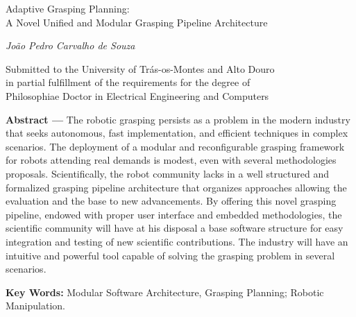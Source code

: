 
\begin{center}
\large{Adaptive Grasping Planning: \\A Novel Unified and Modular Grasping Pipeline Architecture}

\vskip5mm
\normalsize{\textit{João Pedro Carvalho de Souza}}

\vskip5mm
\small{Submitted to the University of Trás-os-Montes and Alto Douro \\
in partial fulfillment of the requirements for the degree of \\
Philosophiae Doctor in Electrical Engineering and Computers}
\end{center}

\textbf{Abstract ---} 
\sloppy
 The robotic grasping persists as a problem in the modern industry that seeks autonomous, fast implementation, and efficient techniques in complex scenarios. The deployment of a modular and reconfigurable grasping framework for robots attending real demands is modest, even with several methodologies proposals. Scientifically, the robot community lacks in a well structured and formalized grasping pipeline architecture that organizes approaches allowing the evaluation and the base to new advancements. By offering this novel grasping pipeline, endowed with proper user interface and embedded methodologies, the scientific community will have at his disposal a base software structure for easy integration and testing of new scientific contributions. The industry will have an intuitive and powerful tool capable of solving the grasping problem in several scenarios.
 
\textbf{Key Words:} Modular Software Architecture, Grasping Planning; Robotic Manipulation. 

